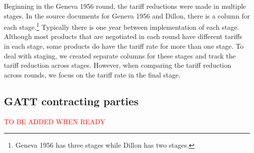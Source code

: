 \documentclass[
  12pt,
]{article}
\begin{document}
Beginning in the Geneva 1956 round, the tariff reductions were made in multiple stages. In the source documents for Geneva 1956 and Dillon, there is a column for each stage.\footnote{Geneva 1956 has three stages while Dillon has two stages.} Typically there is one year between implementation of each stage. Although most products that are negotiated in each round have different tariffs in each stage, some products do have the tariff rate for more than one stage. To deal with staging, we created separate columns for these stages and track the tariff reduction across stages. However, when comparing the tariff reduction across rounds, we focus on the tariff rate in the final stage.

\hypertarget{gatt-contracting-parties}{%
\subsection{GATT contracting parties}\label{gatt-contracting-parties}}

\textcolor{red}{TO BE ADDED WHEN READY}
\end{document}
